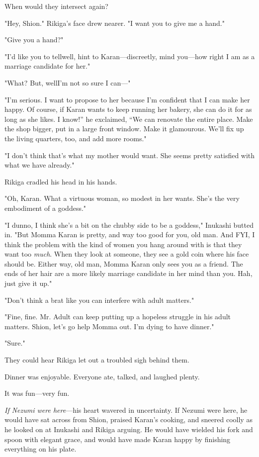 When would they intersect again?

"Hey, Shion." Rikiga's face drew nearer. "I want you to give me a hand."

"Give you a hand?"

"I'd like you to tell\el well, hint to Karan---discreetly, mind
you---how right I am as a marriage candidate for her."

"What? But, well\el I'm not so sure I can---"

"I'm serious. I want to propose to her because I'm confident that I can
make her happy. Of course, if Karan wants to keep running her bakery,
she can do it for as long as she likes. I know!'' he exclaimed, ``We can
renovate the entire place. Make the shop bigger, put in a large front
window. Make it glamourous. We'll fix up the living quarters, too, and
add more rooms."

"I don't think that's what my mother would want. She seems pretty
satisfied with what we have already."

Rikiga cradled his head in his hands.

"Oh, Karan. What a virtuous woman, so modest in her wants.
She's the very embodiment of a goddess."

"I dunno, I think she's a bit on the chubby side to be a goddess,"
Inukashi butted in. "But Momma Karan is pretty, and way too good for
you, old man. And FYI, I think the problem with the kind of women you
hang around with is that they want too \emph{much}. When they look at someone,
they see a gold coin where his face should be. Either way, old man,
Momma Karan only sees you as a friend. The ends of her hair are a more
likely marriage candidate in her mind than you. Hah, just give it up."

"Don't think a brat like you can interfere with adult matters."

"Fine, fine. Mr. Adult can keep putting up a hopeless struggle in his
adult matters. Shion, let's go help Momma out. I'm dying to have
dinner."

"Sure."

They could hear Rikiga let out a troubled sigh behind them.

Dinner was enjoyable. Everyone ate, talked, and laughed plenty.

It was fun---very fun.

\emph{If Nezumi were here}---his heart wavered in uncertainty. If Nezumi were
here, he would have sat across from Shion, praised Karan's cooking, and
sneered coolly as he looked on at Inukashi and Rikiga arguing. He would
have wielded his fork and spoon with elegant grace, and would have made
Karan happy by finishing everything on his plate.

